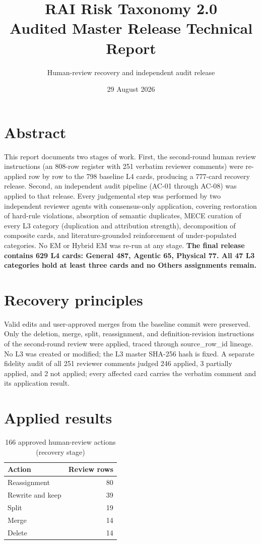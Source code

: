 \documentclass[11pt,a4paper]{article}
\begin{document}
\title{RAI Risk Taxonomy 2.0\\Audited Master Release Technical Report}\author{Human-review recovery and independent audit release}\date{29 August 2026}\maketitle
\par\section*{Abstract}
This report documents two stages of work. First, the second-round human review instructions (an 808-row register with 251 verbatim reviewer comments) were re-applied row by row to the 798 baseline L4 cards, producing a 777-card recovery release. Second, an independent audit pipeline (AC-01 through AC-08) was applied to that release. Every judgemental step was performed by two independent reviewer agents with consensus-only application, covering restoration of hard-rule violations, absorption of semantic duplicates, MECE curation of every L3 category (duplication and attribution strength), decomposition of composite cards, and literature-grounded reinforcement of under-populated categories. No EM or Hybrid EM was re-run at any stage. \textbf{The final release contains 629 L4 cards: General 487, Agentic 65, Physical 77. All 47 L3 categories hold at least three cards and no Others assignments remain.}
\par\section{Recovery principles}
Valid edits and user-approved merges from the baseline commit were preserved. Only the deletion, merge, split, reassignment, and definition-revision instructions of the second-round review were applied, traced through source\_row\_id lineage. No L3 was created or modified; the L3 master SHA-256 hash is fixed. A separate fidelity audit of all 251 reviewer comments judged 246 applied, 3 partially applied, and 2 not applied; every affected card carries the verbatim comment and its application result.
\par\section{Applied results}
\begin{table}[h]\centering\begin{tabular}{lr}\toprule Action & Review rows\\\midrule Reassignment & 80\\Rewrite and keep & 39\\Split & 19\\Merge & 14\\Delete & 14\\\bottomrule\end{tabular}\caption{166 approved human-review actions (recovery stage)}\end{table}
\end{document}

